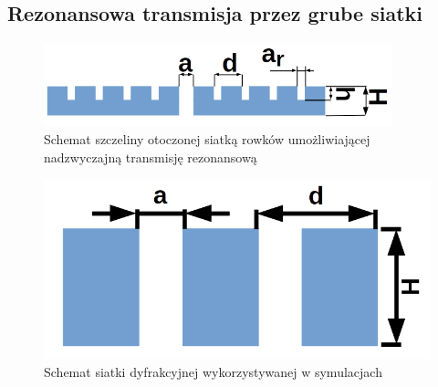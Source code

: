 \subsection{Rezonansowa transmisja przez grube siatki}
\label{subart:rezo-grating}

\begin{figure}[tb]
	\centering
	\includegraphics[width=0.9\textwidth]{images/thz/schemat-1szczelina.png}
	\caption{Schemat szczeliny otoczonej siatką rowków umożliwiającej nadzwyczajną transmisję rezonansową}
	\label{fig:szczelina-schem}
\end{figure}

\begin{figure}[bt]
	\includegraphics[width=\textwidth]{images/thz/schemat-siatka.png}
	\caption{Schemat siatki dyfrakcyjnej wykorzystywanej w symulacjach}
	\label{fig:rezo-siat-H}
\end{figure}

